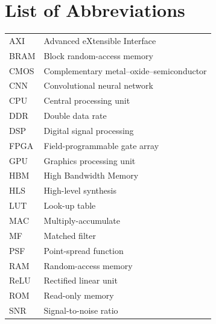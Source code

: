 \section*{List of Abbreviations}

\begin{tabular}{@{}p{2.2cm}p{11cm}@{}}
    AXI & Advanced eXtensible Interface \\
    BRAM & Block random-access memory \\
    CMOS & Complementary metal--oxide--semiconductor \\
    CNN & Convolutional neural network \\
    CPU & Central processing unit \\
    DDR & Double data rate \\
    DSP & Digital signal processing \\
    FPGA & Field-programmable gate array \\
    GPU & Graphics processing unit \\
    HBM & High Bandwidth Memory \\
    HLS & High-level synthesis \\
    LUT & Look-up table \\
    MAC & Multiply-accumulate \\
    MF & Matched filter \\
    PSF & Point-spread function \\
    RAM & Random-access memory \\
    ReLU & Rectified linear unit \\
    ROM & Read-only memory \\
    SNR & Signal-to-noise ratio \\
\end{tabular}
